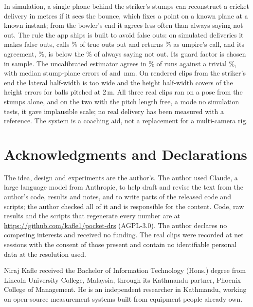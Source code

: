 \documentclass[journal]{IEEEtran}
\begin{document}
In simulation, a single phone behind the striker's stumps can reconstruct a cricket delivery in metres if
it sees the bounce, which fixes a point on a known plane at a known instant; from the bowler's end it agrees
less often than always saying not out. The rule the app ships is built to
avoid false outs: on \RiskN{} simulated deliveries it makes \RiskCalFalseOutFive{} false outs, calls
\RiskCalOutRecallFive\% of true outs out and returns \RiskCalOutToUmpFive\% as umpire's call, and its
agreement, \RiskCalAgreeFive\%, is below the \RiskAlwaysNotOutPct\% of always saying not out. Its guard
factor is chosen in sample. The uncalibrated estimator agrees in \GeoAgreeAll\% of runs against a trivial
\GeoAlwaysNotOutPct\%, with median stump-plane errors of \GeoMedYAll{} and \GeoMedZAll\,mm. On rendered clips from the striker's end the lateral half-width is too wide and the
height half-width covers \EteCoverZLenTwo{} of the \EteCoverZLenTwoN{} height errors for balls pitched at 2\,m. All three real clips ran
on a pose from the stumps alone, and on the two with the pitch length free, a mode no simulation tests, it gave implausible scale; no real delivery has been measured with a
reference.
The system is a coaching aid, not a replacement for a multi-camera rig.

\section*{Acknowledgments and Declarations}

The idea, design and experiments are the author's. The author used Claude, a large language model from Anthropic, to help draft and revise the text from the author's code,
results and notes, and to write parts of the released code and scripts; the author checked all of it and
is responsible for the content. Code, raw results and the scripts that regenerate every number are at
\url{https://github.com/kafle1/pocket-drs} (AGPL-3.0). The author declares no competing interests and received no
funding. The real clips were recorded at net sessions with the consent of those present and contain no
identifiable personal data at the resolution used.




\begin{IEEEbiographynophoto}{Niraj Kafle}
received the Bachelor of Information Technology (Hons.) degree from Lincoln University College, Malaysia,
through its Kathmandu partner, Phoenix College of Management. He is an independent researcher in Kathmandu,
working on open-source measurement systems built from equipment people already own.
\end{IEEEbiographynophoto}
\end{document}
